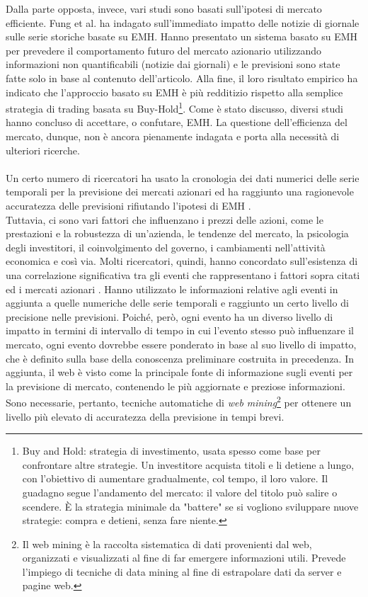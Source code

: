 \documentclass[a4paper,12pt]{report}
\begin{document}
Dalla parte opposta, invece, vari studi sono basati sull'ipotesi di mercato efficiente. Fung et al. \cite{news-nn} ha indagato sull'immediato impatto delle notizie di giornale sulle serie storiche basate su EMH. Hanno presentato un sistema basato su EMH per prevedere il comportamento futuro del mercato azionario utilizzando informazioni non quantificabili (notizie dai giornali) e le previsioni sono state fatte solo in base al contenuto dell'articolo. Alla fine, il loro risultato empirico ha indicato che l'approccio basato su EMH è più redditizio rispetto alla semplice strategia di trading basata su Buy-Hold\footnote{Buy and Hold: strategia di investimento, usata spesso come base per confrontare altre strategie. Un investitore acquista titoli e li detiene a lungo, con l'obiettivo di aumentare gradualmente, col tempo, il loro valore. Il guadagno segue l'andamento del mercato: il valore del titolo può salire o scendere. È la strategia minimale da "battere" se si vogliono sviluppare nuove strategie: compra e detieni, senza fare niente.}. Come è stato discusso, diversi studi hanno concluso di accettare, o confutare, EMH. La questione dell'efficienza del mercato, dunque, non è ancora pienamente indagata e porta alla necessità di ulteriori ricerche.\\~\\
Un certo numero di ricercatori ha usato la cronologia dei dati numerici delle serie temporali per la previsione dei mercati azionari ed ha raggiunto una ragionevole accuratezza delle previsioni rifiutando l'ipotesi di EMH \cite{nn-eyden}\cite{emh0}.\\Tuttavia, ci sono vari fattori che influenzano i prezzi delle azioni, come le prestazioni e la robustezza di un'azienda, le tendenze del mercato, la psicologia degli investitori, il coinvolgimento del governo, i cambiamenti nell'attività economica e così via. Molti ricercatori, quindi, hanno concordato sull'esistenza di una correlazione significativa tra gli eventi che rappresentano i fattori sopra citati ed i mercati azionari \cite{news-nn}\cite{know-nn2}. Hanno utilizzato le informazioni relative agli eventi in aggiunta a quelle numeriche delle serie temporali e raggiunto un certo livello di precisione nelle previsioni. Poiché, però, ogni evento ha un diverso livello di impatto in termini di intervallo di tempo in cui l'evento stesso può influenzare il mercato, ogni evento dovrebbe essere ponderato in base al suo livello di impatto, che è definito sulla base della conoscenza preliminare costruita in precedenza. In aggiunta, il web è visto come la principale fonte di informazione sugli eventi per la previsione di mercato, contenendo le più aggiornate e preziose informazioni. Sono necessarie, pertanto, tecniche automatiche di \textit{web mining}\footnote{Il web mining è la raccolta sistematica di dati provenienti dal web, organizzati e visualizzati al fine di far emergere informazioni utili. Prevede l'impiego di tecniche di data mining al fine di estrapolare dati da server e pagine web.} per ottenere un livello più elevato di accuratezza della previsione in tempi brevi.
\end{document}
